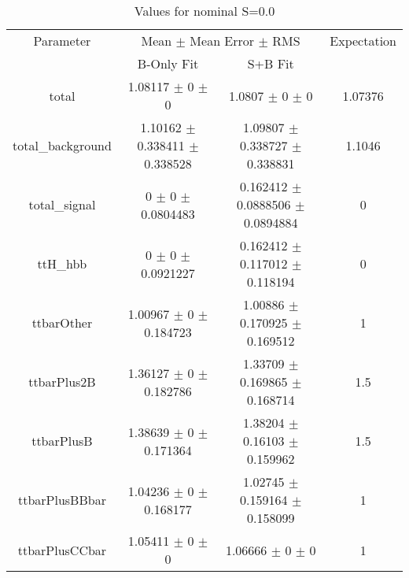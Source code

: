 \begin{table}
\centering
\caption{Values for nominal S=0.0}
\begin{tabular}{cccc}
\toprule
Parameter & \multicolumn{2}{c}{Mean $\pm$ Mean Error $\pm$ RMS} & Expectation\\
 & B-Only Fit & S+B Fit & \\
\midrule
total & \num{1.08117} $\pm$ \num{0} $\pm$ \num{0} & \num{1.0807} $\pm$ \num{0} $\pm$ \num{0} & \num{1.07376}\\
total\_background & \num{1.10162} $\pm$ \num{0.338411} $\pm$ \num{0.338528} & \num{1.09807} $\pm$ \num{0.338727} $\pm$ \num{0.338831} & \num{1.1046}\\
total\_signal & \num{0} $\pm$ \num{0} $\pm$ \num{0.0804483} & \num{0.162412} $\pm$ \num{0.0888506} $\pm$ \num{0.0894884} & \num{0}\\
ttH\_hbb & \num{0} $\pm$ \num{0} $\pm$ \num{0.0921227} & \num{0.162412} $\pm$ \num{0.117012} $\pm$ \num{0.118194} & \num{0}\\
ttbarOther & \num{1.00967} $\pm$ \num{0} $\pm$ \num{0.184723} & \num{1.00886} $\pm$ \num{0.170925} $\pm$ \num{0.169512} & \num{1}\\
ttbarPlus2B & \num{1.36127} $\pm$ \num{0} $\pm$ \num{0.182786} & \num{1.33709} $\pm$ \num{0.169865} $\pm$ \num{0.168714} & \num{1.5}\\
ttbarPlusB & \num{1.38639} $\pm$ \num{0} $\pm$ \num{0.171364} & \num{1.38204} $\pm$ \num{0.16103} $\pm$ \num{0.159962} & \num{1.5}\\
ttbarPlusBBbar & \num{1.04236} $\pm$ \num{0} $\pm$ \num{0.168177} & \num{1.02745} $\pm$ \num{0.159164} $\pm$ \num{0.158099} & \num{1}\\
ttbarPlusCCbar & \num{1.05411} $\pm$ \num{0} $\pm$ \num{0} & \num{1.06666} $\pm$ \num{0} $\pm$ \num{0} & \num{1}\\
\bottomrule
\end{tabular}
\end{table}